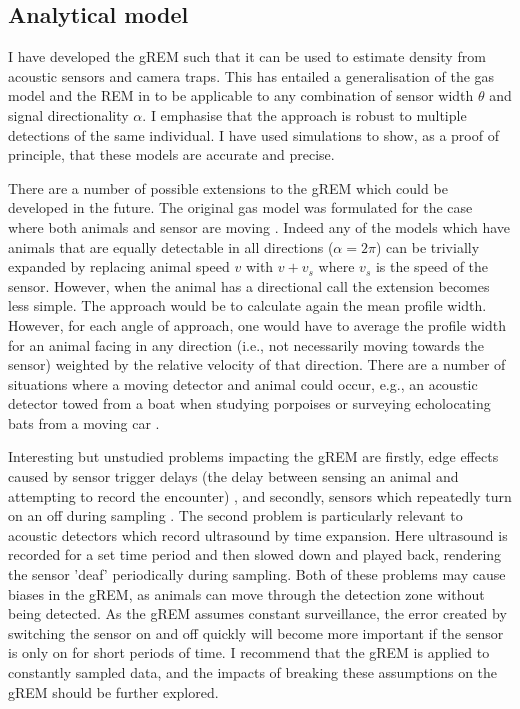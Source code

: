 \subsection{Analytical model}

I have developed the gREM such that it can be used to estimate density from acoustic sensors and camera traps.
This has entailed a generalisation of the gas model and the REM in \cite{rowcliffe2008estimating} to be applicable to any combination of sensor width  $\theta$ and signal directionality $\alpha$.
I emphasise that the approach is robust to multiple detections of the same individual.
I have used simulations to show, as a proof of principle, that these models are accurate and precise. 

There are a number of possible extensions to the gREM which could be developed in the future.
The original gas model was formulated for the case where both animals and sensor are moving \cite{Hutchinson_Waser_2007}.
Indeed any of the models which have animals that are equally detectable in all directions ($\alpha = 2\pi$) can be trivially expanded by replacing animal speed $v$ with $v + v_s$ where $v_s$ is the speed of the sensor.
However, when the animal has a directional call the extension becomes less simple.
The approach would be to calculate again the mean profile width.
However, for each angle of approach, one would have to average the profile width for an animal facing in any direction (i.e., not necessarily moving towards the sensor) weighted by the relative velocity of that direction.
There are a number of situations where a moving detector and animal could occur, e.g., an acoustic detector towed from a boat when studying porpoises \cite{kimura2014acoustic} or surveying echolocating bats from a moving car \cite{jones2011indicator}. 

Interesting but unstudied problems impacting the gREM are firstly, edge effects caused by sensor trigger delays (the delay between sensing an animal and attempting to record the encounter) \cite{rovero2013camera}, and secondly, sensors which repeatedly turn on an off during sampling \cite{jones2011indicator}.
The second problem is particularly relevant to acoustic detectors which record ultrasound by time expansion.
Here ultrasound is recorded for a set time period and then slowed down and played back, rendering the sensor 'deaf' periodically during sampling.
Both of these problems may cause biases in the gREM, as animals can move through the detection zone without being detected.
As the gREM assumes constant surveillance, the error created by switching the sensor on and off quickly will become more important if the sensor is only on for short periods of time.
I recommend that the gREM is applied to constantly sampled data, and the impacts of breaking these assumptions on the gREM should be further explored. 

